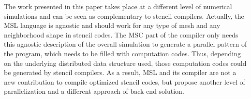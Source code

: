 The work presented in this paper takes place at a different level of numerical simulations and can be seen as complementary to stencil compilers. Actually, the MSL language is agnostic and should work for any type of mesh and any neighborhood shape in stencil codes. The MSC part of the compiler only needs this agnostic description of the overall simulation to generate a parallel pattern of the program, which needs to be filled with computation codes. Thus, depending on the underlying distributed data structure used, those computation codes could be generated by stencil compilers. As a result, MSL and its compiler are not a new contribution to compile optimized stencil codes, but propose another level of parallelization and a different approach of back-end solution.




